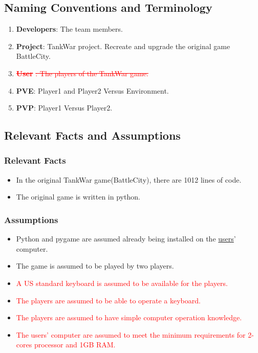 \documentclass[12pt, titlepage]{article}
\begin{document}
\subsection{Naming Conventions and Terminology}
\begin{enumerate}[1.]
	\item \textbf{Developers}: The team members.
	\item \textbf{Project}: TankWar project. Recreate and upgrade the original game BattleCity.
	\item \textbf{\textcolor{red}{\sout{User}}} \textcolor{red}{\sout{: The players of the TankWar game.}}
	\item \textbf{PVE}: Player1 and Player2 Versus Environment.
	\item \textbf{PVP}: Player1 Versus Player2.
\end{enumerate}

\subsection{Relevant Facts and Assumptions}
\subsubsection{Relevant Facts}
\begin{itemize}

\item In the original TankWar game(BattleCity), there are 1012 lines of code.
\item The original game is written in python.
\end{itemize}
 

\subsubsection{Assumptions}
\begin{itemize}
 
\item Python and pygame are assumed already being installed on the \underline{users}' computer.
\item The game is assumed to be played by two players.
\item \textcolor{red}{A US standard keyboard is assumed to be available for the players.}
\item \textcolor{red}{The players are assumed to be able to operate a keyboard.}
\item \textcolor{red}{The players are assumed to have simple computer operation knowledge.}
\item \textcolor{red}{The users' computer are assumed to meet the minimum requirements for 2-cores processor and 1GB RAM.}
\end{itemize}
 
\end{document}
